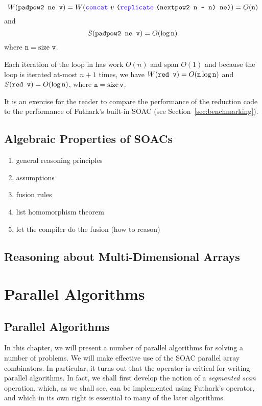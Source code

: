 \documentclass[oneside,11pt]{book}
\newcommand{\size}{\ensuremath{\mathrm{size}}}
\renewcommand{\log}{\ensuremath{\mathrm{log}}}
\begin{document}
$$W(\kw{padpow2 ne v}) = W(\fop{concat}~v~\kw{(}\fop{replicate}~\kw{(nextpow2 n - n) ne)}) = O(\kw{n})$$
and
$$S(\kw{padpow2 ne v}) = O(\log\,\kw{n})$$
where $\kw{n} = \size~\kw{v}$.

Each iteration of the loop in  has work $O(n)$ and span $O(1)$
and because the loop is iterated at-most $n+1$ times, we have
$W(\kw{red v}) = O(\kw{n}\,\log\,\kw{n})$ and $S(\kw{red v}) =
O(\log\,\kw{n})$, where $\kw{n} = \size\,\kw{v}$.

It is an exercise for the reader to compare the performance of the
reduction code to the performance of Futhark's built-in 
SOAC (see Section~\ref{sec:benchmarking}).

\chapter{Algebraic Properties of SOACs}
\label{chap:soac-algebra}

\begin{enumerate}
\item general reasoning principles
\item assumptions
\item fusion rules
\item list homomorphism theorem
\item let the compiler do the fusion (how to reason)
\end{enumerate}

\chapter{Reasoning about Multi-Dimensional Arrays}

\part{Parallel Algorithms}

\chapter{Parallel Algorithms}
\label{chap:parallel-algorithms}

In this chapter, we will present a number of parallel algorithms for
solving a number of problems. We will make effective use of the
SOAC parallel array combinators. In particular, it turns out that the
 operator is critical for writing parallel algorithms. In
fact, we shall first develop the notion of a \emph{segmented scan}
operation, which, as we shall see, can be implemented using Futhark's 
operator, and which in its own right is essential to many of the later
algorithms.
\end{document}
